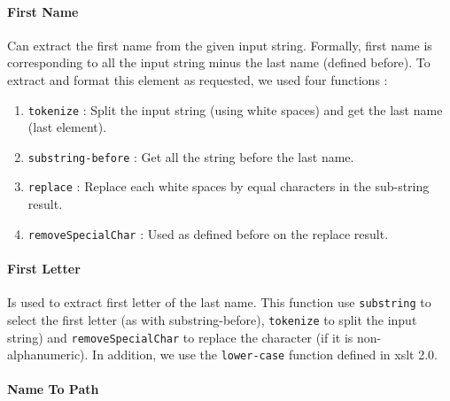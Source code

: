 \documentclass{article}
\begin{document}
\paragraph{First Name} Can extract the first name from the given input string. Formally, first name is corresponding to all the input string minus the last name (defined before). To extract and format this element as requested, we used four functions :
\begin{enumerate}
\item \verb|tokenize| : Split the input string (using white spaces) and get the last name (last element).
\item \verb|substring-before| : Get all the string before the last name.
\item \verb|replace| : Replace each white spaces by equal characters in the sub-string result.
\item \verb|removeSpecialChar| : Used as defined before on the replace result.
\end{enumerate}

\paragraph{First Letter} Is used to extract first letter of the last name. This function use \verb|substring| to select the first letter (as with substring-before), \verb|tokenize| to split the input string) and \verb|removeSpecialChar| to replace the character (if it is non-alphanumeric). In addition, we use the \verb|lower-case| function defined in xslt 2.0. 

\paragraph{Name To Path}
\end{document}
